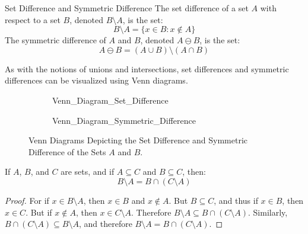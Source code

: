 \documentclass[crop=false,class=book,oneside]{standalone}
\begin{document}
            \begin{ldefinition}{Set Difference and Symmetric Difference}
                The set difference of a set $A$ with respect to a set $B$,
                denoted $B\setminus{A}$, is the set:
                \begin{equation}
                    B\setminus{A}=\{x\in{B}:x\notin{A}\}
                \end{equation}
                The symmetric difference of $A$ and $B$, denoted
                $A\ominus{B}$, is the set:
                \begin{equation}
                    A\ominus{B}=(A\cup{B})\setminus(A\cap{B})
                \end{equation}
            \end{ldefinition}
            As with the notions of unions and intersections, set differences and
            symmetric differences can be visualized using Venn diagrams.
            \begin{figure}[H]
                \centering
                \captionsetup{type=figure}
                \begin{subfigure}[b]{0.49\textwidth}
                    \centering
                    {Venn_Diagram_Set_Difference}
                \end{subfigure}
                \begin{subfigure}[b]{0.49\textwidth}
                    \centering
                    {Venn_Diagram_Symmetric_Difference}
                \end{subfigure}
                \caption{Venn Diagrams Depicting the Set Difference and
                         Symmetric Difference of the Sets $A$ and $B$.}
                \label{fig:MEASURE_THEORY_Difference_sym_venn_diagram}
            \end{figure}
            \begin{theorem}
                \label{thm:MEASURE_THEORY_SET_DIFFERENCE_AS_INTERSECTION}
                If $A$, $B$, and $C$ are sets, and if $A\subseteq{C}$
                and $B\subseteq{C}$, then:
                \begin{equation}
                    B\setminus{A}=B\cap(C\setminus{A})
                \end{equation}
            \end{theorem}
            \begin{proof}
                For if $x\in{B}\setminus{A}$, then
                $x\in{B}$ and $x\notin{A}$. But
                $B\subseteq{C}$, and thus if $x\in{B}$, then $x\in{C}$.
                But if $x\notin{A}$, then $x\in{C}\setminus{A}$. Therefore
                $B\setminus{A}\subseteq{B}\cap(C\setminus{A})$.
                Similarly, $B\cap(C\setminus{A})\subseteq{B}\setminus{A}$,
                and therefore $B\setminus{A}={B}\cap(C\setminus{A})$.
            \end{proof}
\end{document}
